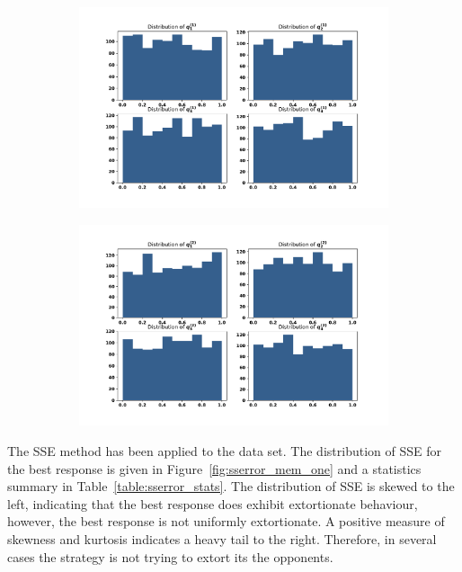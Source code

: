 \documentclass[10pt]{article}
\begin{document}
\begin{figure}[!htbp]
    \begin{subfigure}{0.49\textwidth}
        \centering
        \includegraphics[width=\linewidth]{img/first_opponent_probabilities.pdf}
        \label{fig:first_opponents_probabilities}
    \end{subfigure}
    \begin{subfigure}{0.49\textwidth}
        \centering
        \includegraphics[width=\linewidth]{img/second_opponent_probabilities.pdf}
        \label{fig:second_opponents_probabilities}
    \end{subfigure}
\end{figure}

The SSE method has been applied to the data set. The distribution of SSE for the best response is given in
Figure~\ref{fig:sserror_mem_one} and a statistics summary in
Table~\ref{table:sserror_stats}. The distribution of SSE is skewed to the left,
indicating that the best response does exhibit extortionate behaviour, however,
the best response is not uniformly extortionate. A positive measure of skewness
and kurtosis indicates a heavy tail to the right. Therefore, in several cases the
strategy is not trying to extort its the opponents.
\end{document}
